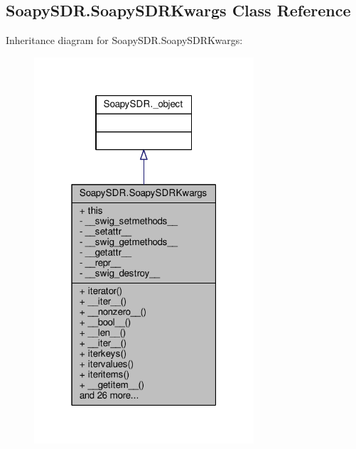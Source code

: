 \subsection{Soapy\+S\+D\+R.\+Soapy\+S\+D\+R\+Kwargs Class Reference}
\label{classSoapySDR_1_1SoapySDRKwargs}


Inheritance diagram for Soapy\+S\+D\+R.\+Soapy\+S\+D\+R\+Kwargs\+:
\nopagebreak
\begin{figure}[H]
\begin{center}
\leavevmode
\includegraphics[width=232pt]{dc/d75/classSoapySDR_1_1SoapySDRKwargs__inherit__graph}
\end{center}
\end{figure}


